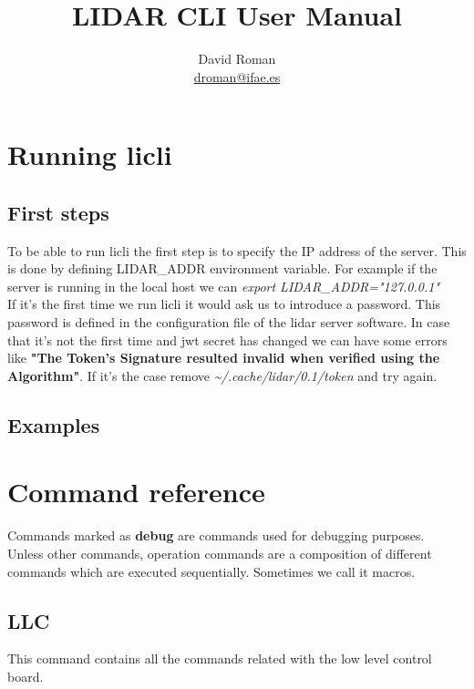 \documentclass[letterpaper, 10 pt]{article}
\begin{document}
\title{LIDAR CLI User Manual}
\author{David Roman \\  \href{mailto:droman@ifae.es}{droman@ifae.es} }
\maketitle
\pagestyle{empty}
\newpage
\tableofcontents
\newpage
{}
\pagestyle{plain}

\section{Running licli}
\subsection{First steps}
To be able to run licli the first step is to specify the IP address of the server. This is done by defining LIDAR\_ADDR environment variable. For example if the server is running in the local host we can \emph{export LIDAR\_ADDR="127.0.0.1"}\\
\linebreak
If it's the first time we run licli it would ask us to introduce a password. This password is defined in the configuration file of the lidar server software. 
In case that it's not the first time and jwt secret has changed we can have some errors like \textbf{"The Token's Signature resulted invalid when verified using the Algorithm"}. If it's the case remove \textit{\~{}/.cache/lidar/0.1/token} and try again.\\
\subsection{Examples}

\section{Command reference}
Commands marked as \textbf{debug} are commands used for debugging purposes.\\
\linebreak
Unless other commands, operation commands are a composition of different commands which are executed sequentially. Sometimes we call it macros.
\subsection{LLC}
This command contains all the commands related with the low level control board.
\end{document}
